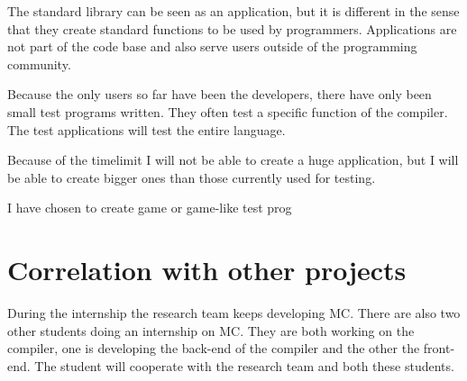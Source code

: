 The standard library can be seen as an application, but it is different in the sense that they create standard functions to be used by programmers.
Applications are not part of the code base and also serve users outside of the programming community.

Because the only users so far have been the developers, there have only been small test programs written.
They often test a specific function of the compiler.
The test applications will test the entire language.

Because of the timelimit I will not be able to create a huge application, but I will be able to create bigger ones than those currently used for testing.

I have chosen to create game or game-like test prog




\section{Correlation with other projects}
During the internship the research team keeps developing MC.
There are also two other students doing an internship on MC.
They are both working on the compiler, one is developing the back-end of the compiler and the other the front-end.
The student will cooperate with the research team and both these students.







